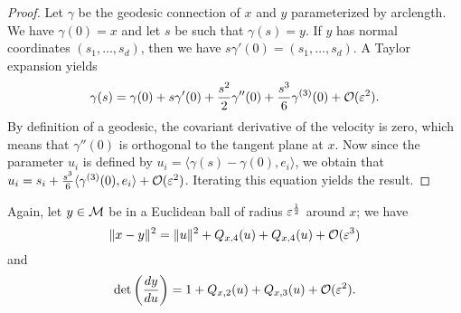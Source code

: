 \begin{proof}
Let $\gamma$ be the geodesic connection of $x$ and $y$ parameterized by arclength. We have $\gamma(0)=x$ and let $s$ be such that $\gamma(s)=y$. If $y$ has normal coordinates $(s_1,\dots,s_d)$, then we have $s\gamma'(0)=(s_1,\dots,s_d)$. A Taylor expansion yields
\begin{equation*}
\gamma(s)=\gamma(0)+s\gamma'(0)+\frac{s^2}{2}\gamma''(0)+\frac{s^3}{6}\gamma^{(3)}(0)+\mathcal{O}(\varepsilon^2).
\end{equation*}
By definition of a geodesic, the covariant derivative of the velocity is zero, which means that $\gamma''(0)$ is orthogonal to the tangent plane at $x$. Now since the parameter $u_i$ is defined by $u_i=\langle\gamma(s)-\gamma(0),e_i\rangle$, we obtain that $u_i=s_i+\frac{s^3}{6}\langle\gamma^{(3)}(0),e_i\rangle+\mathcal{O}(\varepsilon^2)$. Iterating this equation yields the result.
\end{proof}

\begin{lemma}
Again, let $y\in\mathcal{M}$ be in a Euclidean ball of radius $\varepsilon^\frac{1}{2}$ around $x$; we have
\begin{equation}\label{eq:metricComparison}
\|x-y\|^2=\|u\|^2+Q_{x,4}(u)+Q_{x,4}(u)+\mathcal{O}(\varepsilon^3)
\end{equation}
and
\begin{equation}\label{eq:volumeComparison}
\det\left(\frac{dy}{du}\right)=1+Q_{x,2}(u)+Q_{x,3}(u)+\mathcal{O}(\varepsilon^2).
\end{equation}
\end{lemma}

